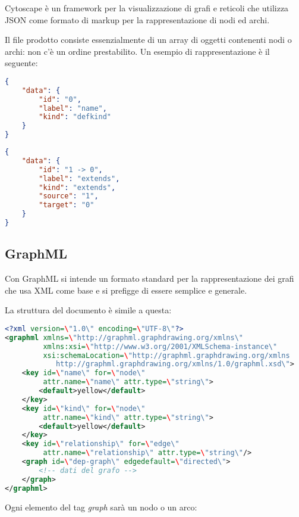 Cytoscape \cite{CytoscapeJS} \`e un framework per la visualizzazione di grafi e reticoli che utilizza JSON come formato di markup per la rappresentazione di nodi ed archi.

Il file prodotto consiste essenzialmente di un array di oggetti contenenti nodi o archi: non c'\`e un ordine prestabilito. Un esempio di rappresentazione \`e il seguente:

\begin{lstlisting}[language=JSON, caption=esempio di nodo]
{
    "data": {
        "id": "0",
        "label": "name",
        "kind": "defkind"
    }
}
\end{lstlisting}

\begin{lstlisting}[language=JSON, caption=esempio di arco]
{
    "data": {
        "id": "1 -> 0",
        "label": "extends",
        "kind": "extends",
        "source": "1",
        "target": "0"
    }
}
\end{lstlisting}

\subsection{GraphML}

Con GraphML \cite{GraphML} si intende un formato standard per la rappresentazione dei grafi che usa XML come base e si prefigge di essere semplice e generale.

La struttura del documento \`e simile a questa:

\begin{lstlisting}[language=XML, caption=file GraphML]
<?xml version=\"1.0\" encoding=\"UTF-8\"?>
<graphml xmlns=\"http://graphml.graphdrawing.org/xmlns\"
         xmlns:xsi=\"http://www.w3.org/2001/XMLSchema-instance\"
         xsi:schemaLocation=\"http://graphml.graphdrawing.org/xmlns
            http://graphml.graphdrawing.org/xmlns/1.0/graphml.xsd\">
    <key id=\"name\" for=\"node\"
         attr.name=\"name\" attr.type=\"string\">
        <default>yellow</default>
    </key>
    <key id=\"kind\" for=\"node\"
         attr.name=\"kind\" attr.type=\"string\">
        <default>yellow</default>
    </key>
    <key id=\"relationship\" for=\"edge\"
         attr.name=\"relationship\" attr.type=\"string\"/>
    <graph id=\"dep-graph\" edgedefault=\"directed\">
        <!-- dati del grafo -->
    </graph>
</graphml>
\end{lstlisting}

Ogni elemento del tag \emph{graph} sar\`a un nodo o un arco:

